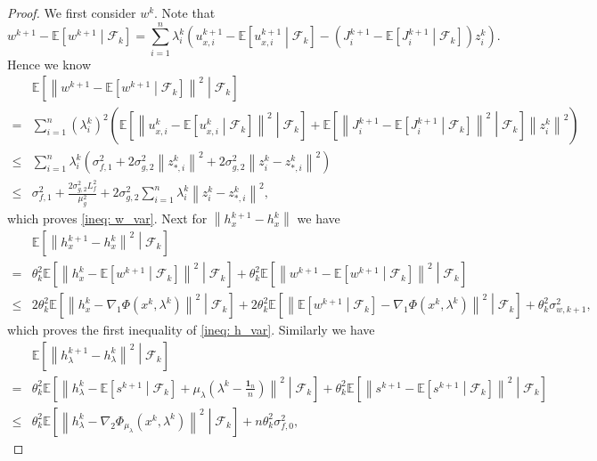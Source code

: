 \documentclass[10pt]{article}
\theoremstyle{remark}
\def\setF{\mathscr{F}} %
\newcommand{\E}{\mathbb{E}}
\newcommand{\norm}[1]{\left\|#1\right\|}
\newcommand{\bfone}{\mathbf{1}}
\begin{document}
\begin{proof}
We first consider $w^k$. Note that
\[
    w^{k+1} - \E\left[w^{k+1}\middle|\setF_k\right] = \sum_{i=1}^{n}\lambda_i^k\left(u_{x,i}^{k+1} - \E\left[u_{x,i}^{k+1}\middle|\setF_k\right] - \left(J_i^{k+1} - \E\left[J_i^{k+1}\middle|\setF_k\right]\right)z_i^k\right).
\]
Hence we know 
\begin{align*}
    &\E\left[\norm{w^{k+1} - \E\left[w^{k+1}\middle|\setF_k\right]}^2\middle|\setF_k\right] \\
        = &\sum_{i=1}^{n}\left(\lambda_i^k\right)^2\left(\E\left[\norm{u_{x,i}^k - \E\left[u_{x,i}^k\middle|\setF_k\right]}^2\middle|\setF_k\right] + 
        \E\left[\norm{J_i^{k+1} - \E\left[J_i^{k+1}\middle|\setF_k\right]}^2\middle|\setF_k\right]\norm{z_i^k}^2  \right) \\
        \leq &\sum_{i=1}^{n}\lambda_i^k\left(\sigma_{f,1}^2 + 2\sigma_{g,2}^2\norm{z_{*,i}^k}^2 + 2\sigma_{g,2}^2\norm{z_i^k - z_{*,i}^k}^2\right) \\
        \leq & \sigma_{f,1}^2 + \frac{2\sigma_{g,2}^2L_f^2}{\mu_g^2} + 2\sigma_{g,2}^2\sum_{i=1}^{n}\lambda_i^k\norm{z_i^k - z_{*,i}^k}^2,
\end{align*}
which proves \eqref{ineq: w_var}. Next for $\norm{h_x^{k+1} - h_x^k}$ we have
\begin{align*}
    &\E\left[\norm{h_x^{k+1} - h_x^k}^2\middle|\setF_k\right] \\
    = &\theta_k^2\E\left[\norm{h_x^k - \E\left[w^{k+1}\middle|\setF_k\right]}^2\middle|\setF_k\right] + \theta_k^2\E\left[\norm{w^{k+1} - \E\left[w^{k+1}\middle|\setF_k\right] }^2\middle|\setF_k\right] \\
    \leq &2\theta_k^2\E\left[\norm{h_x^k - \nabla_1\Phi(x^k,\lambda^k)}^2\middle|\setF_k\right] + 2\theta_k^2\E\left[\norm{\E\left[w^{k+1}\middle|\setF_k\right] -\nabla_1\Phi(x^k, \lambda^k) }^2 \middle|\setF_k\right] + \theta_k^2\sigma_{w,k+1}^2,
\end{align*}
which proves the first inequality of \eqref{ineq: h_var}. Similarly we have
\begin{align*}
    &\E\left[\norm{h_{\lambda}^{k+1} - h_{\lambda}^k}^2\middle|\setF_k\right] \\
    = &\theta_k^2\E\left[\norm{h_{\lambda}^k - \E\left[s^{k+1}\middle|\setF_k\right] + \mu_{\lambda}\left(\lambda^k - \frac{\bfone_n}{n}\right)}^2\middle|\setF_k\right] + \theta_k^2\E\left[\norm{s^{k+1} - \E\left[s^{k+1}\middle|\setF_k\right]}^2\middle|\setF_k\right] \\
    \leq &\theta_k^2\E\left[\norm{h_{\lambda}^k - \nabla_2\Phi_{\mu_{\lambda}}(x^k,\lambda^k)}^2\middle|\setF_k\right] + n\theta_k^2\sigma_{f,0}^2,

\end{align*}
\end{proof}
\end{document}
